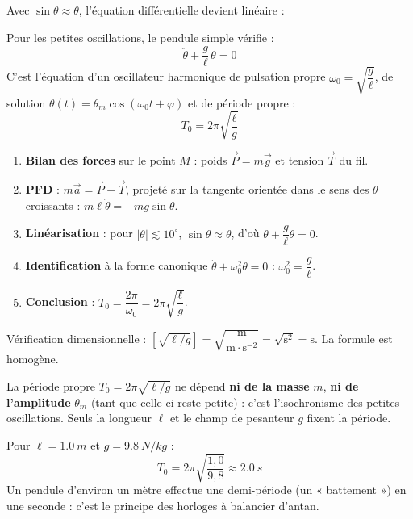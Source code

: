 \documentclass[11pt]{article}
\newcommand{\cle}[1]{{\popxbold\color{popdark}#1}}
\begin{document}
Avec $\sin\theta \approx \theta$, l'équation différentielle devient linéaire :

\begin{propriete}
Pour les petites oscillations, le pendule simple vérifie :
\[ \ddot{\theta} + \frac{g}{\ell}\,\theta = 0 \]
C'est l'équation d'un oscillateur harmonique de pulsation propre $\omega_0 = \sqrt{\dfrac{g}{\ell}}$, de solution $\theta(t) = \theta_m\cos(\omega_0 t + \varphi)$ et de période propre :
\[ \boxed{\ T_0 = 2\pi\sqrt{\frac{\ell}{g}}\ } \]
\end{propriete}

\begin{experience}
\begin{enumerate}
\item \textbf{Bilan des forces} sur le point $M$ : poids $\vec{P} = m\vec{g}$ et tension $\vec{T}$ du fil.
\item \textbf{PFD} : $m\vec{a} = \vec{P} + \vec{T}$, projeté sur la tangente orientée dans le sens des $\theta$ croissants : $m\ell\ddot{\theta} = -mg\sin\theta$.
\item \textbf{Linéarisation} : pour $|\theta| \lesssim 10^{\circ}$, $\sin\theta \approx \theta$, d'où $\ddot{\theta} + \dfrac{g}{\ell}\theta = 0$.
\item \textbf{Identification} à la forme canonique $\ddot{\theta} + \omega_0^2\theta = 0$ : $\omega_0^2 = \dfrac{g}{\ell}$.
\item \textbf{Conclusion} : $T_0 = \dfrac{2\pi}{\omega_0} = 2\pi\sqrt{\dfrac{\ell}{g}}$.
\end{enumerate}
Vérification dimensionnelle : $\left[\sqrt{\ell/g}\right] = \sqrt{\dfrac{\mathrm{m}}{\mathrm{m\cdot s^{-2}}}} = \sqrt{\mathrm{s^2}} = \mathrm{s}$. La formule est homogène.
\end{experience}

\begin{aretenir}
La période propre $T_0 = 2\pi\sqrt{\ell/g}$ ne dépend \textbf{ni de la masse} $m$, \textbf{ni de l'amplitude} $\theta_m$ (tant que celle-ci reste petite) : c'est l'\cle{isochronisme des petites oscillations}. Seuls la longueur $\ell$ et le champ de pesanteur $g$ fixent la période.
\end{aretenir}

\begin{exemplebox}
Pour $\ell = \SI{1,0}{m}$ et $g = \SI{9,8}{N/kg}$ :
\[ T_0 = 2\pi\sqrt{\frac{1{,}0}{9{,}8}} \approx \SI{2,0}{s} \]
Un pendule d'environ un mètre effectue une demi-période (un « battement ») en une seconde : c'est le principe des horloges à balancier d'antan.
\end{exemplebox}
\end{document}
